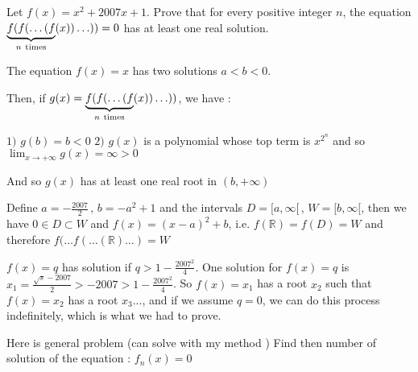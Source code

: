 \begin{mysolution}
	\begin{tcolorbox}Let $ f(x) = x^2 + 2007x + 1$. Prove that for every positive integer $ n$, the equation $ \underbrace{f(f(\ldots(f}_{n\ {\rm times}}(x))\ldots)) = 0$ has at least one real solution.\end{tcolorbox}

The equation $ f(x)=x$ has two solutions $ a<b<0$.

Then, if $ g(x)=\underbrace{f(f(\ldots(f}_{n\ {\rm times}}(x))\ldots))$, we have :

$ 1)$ $ g(b)=b < 0$
$ 2)$ $ g(x)$ is a polynomial whose top term is $ x^{2^n}$ and so ${ \lim_{x\rightarrow+\infty}g(x)=}\infty >0$

And so $ g(x)$ has at least one real root in $ (b,+\infty)$
\end{mysolution}



\begin{mysolution}
	Define $ a=-\frac{2007}{2}\,,\,b=-a^2+1$ and the intervals $ D=[a,\infty[\,,\,W=[b,\infty[$, then we have $ 0\in D\subset W$ and $ f(x)=(x-a)^2+b$, i.e. $ f(\mathbb{R})=f(D)=W$ and therefore $ f(\ldots f(\ldots (\mathbb{R})\ldots )=W$
\end{mysolution}



\begin{mysolution}
	$ f(x)=q$ has solution if $ q>1-\frac{2007^2}4$. One solution for $ f(x)=q$ is $ x_1=\frac{\sqrt s -2007}2>-2007>1-\frac{2007^2}4$. So $ f(x)=x_1$ has a root $ x_2$ such that $ f(x)=x_2$ has a root $ x_3$..., and if we assume $ q=0$, we can do this process indefinitely, which is what we had to prove.
\end{mysolution}



\begin{mysolution}
	Here is general problem (can solve with my method )
Find then number of solution of the equation : $ f_{n}(x)=0$
\end{mysolution}




